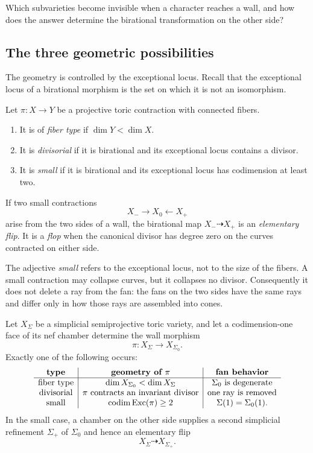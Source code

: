 \begin{guidingquestion}
Which subvarieties become invisible when a character reaches a wall,
and how does the answer determine the birational transformation on the
other side?
\end{guidingquestion}

\subsection{The three geometric possibilities}

The geometry is controlled by the exceptional locus.  Recall that the
exceptional locus of a birational morphism is the set on which it is
not an isomorphism.

\begin{definition}
Let \(\pi:X\to Y\) be a projective toric contraction with connected
fibers.
\begin{enumerate}
\item It is of \emph{fiber type} if
      \(\dim Y<\dim X\).
\item It is \emph{divisorial} if it is birational and its exceptional
      locus contains a divisor.
\item It is \emph{small} if it is birational and its exceptional locus
      has codimension at least two.
\end{enumerate}
If two small contractions
\[
X_-\longrightarrow X_0\longleftarrow X_+
\]
arise from the two sides of a wall, the birational map
\(X_-\dashrightarrow X_+\) is an \emph{elementary flip}.  It is a
\emph{flop} when the canonical divisor has degree zero on the curves
contracted on either side.
\end{definition}

The adjective \emph{small} refers to the exceptional locus, not to the
size of the fibers.  A small contraction may collapse curves, but it
collapses no divisor.  Consequently it does not delete a ray from the
fan: the fans on the two sides have the same rays and differ only in
how those rays are assembled into cones.

\begin{proposition}
\label{prop:wall-crossing-trichotomy}
Let \(X_\Sigma\) be a simplicial semiprojective toric variety, and let a
codimension-one face of its nef chamber determine the wall morphism
\[
\pi:X_\Sigma\longrightarrow X_{\Sigma_0}.
\]
Exactly one of the following occurs:
\[
\begin{array}{c|c|c}
\textbf{type}
&\textbf{geometry of }\pi
&\textbf{fan behavior}
\\
\hline
\text{fiber type}
&\dim X_{\Sigma_0}<\dim X_\Sigma
&\Sigma_0\text{ is degenerate}
\\
\text{divisorial}
&\pi\text{ contracts an invariant divisor}
&\text{one ray is removed}
\\
\text{small}
&\operatorname{codim}\operatorname{Exc}(\pi)\geq2
&\Sigma(1)=\Sigma_0(1).
\end{array}
\]
In the small case, a chamber on the other side supplies a second
simplicial refinement \(\Sigma_+\) of \(\Sigma_0\) and hence an
elementary flip
\[
X_\Sigma\dashrightarrow X_{\Sigma_+}.
\]
\end{proposition}

